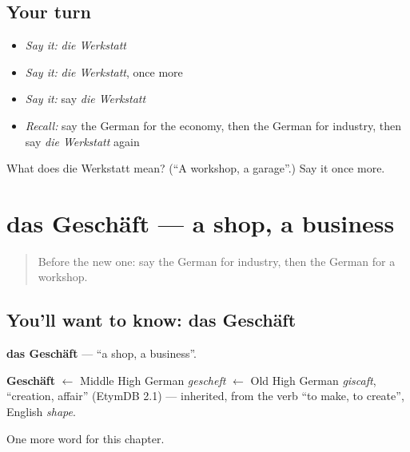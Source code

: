 \subsection*{Your turn}
\begin{itemize}
\raggedright
  \item \emph{Say it:} \emph{die Werkstatt}
  \item \emph{Say it:} \emph{die Werkstatt}, once more
  \item \emph{Say it:} say \emph{die Werkstatt}
  \item \emph{Recall:} say the German for the economy, then the German for industry, then say \emph{die Werkstatt} again
\end{itemize}

\begin{tcolorbox}[breakable,colback=teal!4,colframe=teal!35!black,title={Before you move on}]
What does die Werkstatt mean? (\textquotedblleft{}A workshop, a garage\textquotedblright{}.) Say it once more.
\end{tcolorbox}
\section[das Geschäft]{das Geschäft — a shop, a business}

\label{lesson:GE-C210-geschaeft}



\begin{quote}
Before the new one: say the German for industry, then the German for a workshop.
\end{quote}

\subsection*{You'll want to know: das Geschäft}
\textbf{das Geschäft} — \textquotedblleft{}a shop, a business\textquotedblright{}.

\begin{cousinweb}
\textbf{Geschäft} $\leftarrow$ Middle High German \emph{gescheft} $\leftarrow$ Old High German \emph{giscaft}, \textquotedblleft{}creation, affair\textquotedblright{} (EtymDB 2.1) — inherited, from the verb \textquotedblleft{}to make, to create\textquotedblright{}, English \emph{shape}.
\end{cousinweb}

\begin{grammarlens}[title={What you've built}]
One more word for this chapter.
\end{grammarlens}

